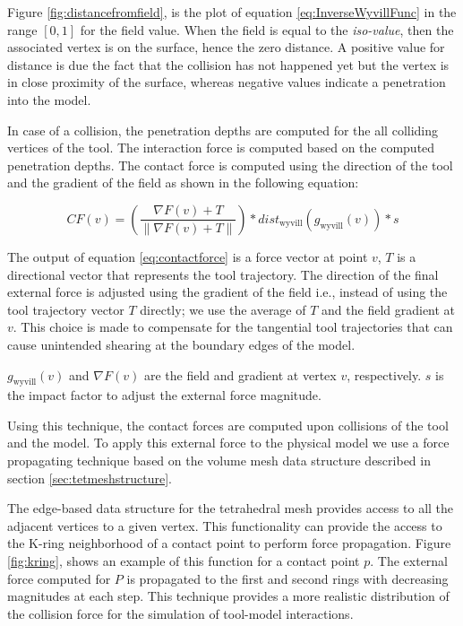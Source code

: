 Figure \ref{fig:distancefromfield}, is the plot of equation \ref{eq:InverseWyvillFunc} 
in the range $\left[0, 1\right]$ for the field value. When the field is equal to 
the \textit{iso-value}, then the associated vertex is on the surface, hence the zero distance. 
A positive value for distance is due the fact that the collision has not happened yet but the vertex 
is in close proximity of the surface, whereas negative values indicate a penetration into the model. 

In case of a collision, the penetration depths are computed for the all colliding vertices of the tool.
The interaction force is computed based on the computed penetration depths. The 
contact force is computed using the direction of the tool and the gradient of the field as shown in the 
following equation:

\begin{equation}
CF(v) = (\frac{\nabla F(v) + T} { \| \nabla F(v) + T \|}) * dist_\mathrm{wyvill}( g_\mathrm{wyvill}(v)) * 
s
\label{eq:contactforce} 
\end{equation}

The output of equation \ref{eq:contactforce} is a force vector at point $v$, $T$ is a directional vector that 
represents the tool trajectory. The direction of the final external force is adjusted using the gradient of 
the field i.e., instead of using the tool trajectory vector $T$ directly; we use the average of $T$ and the field 
gradient at $v$. This choice is made to compensate for the tangential tool trajectories that can cause 
unintended shearing at the boundary edges of the model.

$g_\mathrm{wyvill}(v)$ and $\nabla F(v)$ are the field and gradient at vertex $v$, respectively. $s$ 
is the impact factor to adjust the external force magnitude.

Using this technique, the contact forces are computed upon collisions of the tool and the model. To
apply this external force to the physical model we use a force propagating technique based on 
the volume mesh data structure described in section \ref{sec:tetmeshstructure}. 

The edge-based data structure for the tetrahedral mesh provides access to all the adjacent vertices to a 
given vertex. This functionality can provide the access to the K-ring neighborhood of a contact point to 
perform force propagation. Figure \ref{fig:kring}, shows an example of this function for a contact 
point $p$. The external force computed for $P$ is propagated to the first and second rings with 
decreasing magnitudes at each step. This technique provides a more realistic 
distribution of the collision force for the simulation of tool-model interactions.
 
